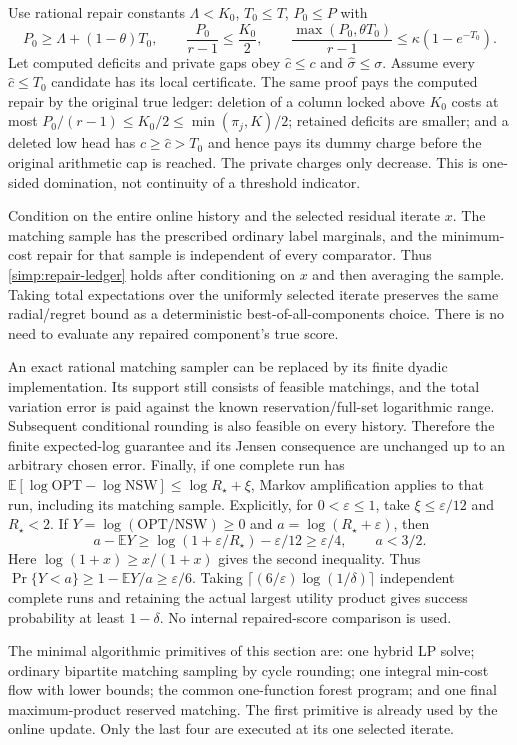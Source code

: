 Use rational repair constants $\Lambda<K_0$, $T_0\le T$, $P_0\le P$
with
\[
 P_0\ge\Lambda+(1-\theta)T_0,\qquad
 \frac{P_0}{r-1}\le\frac{K_0}{2},\qquad
 \frac{\max(P_0,\theta T_0)}{r-1}
                         \le\kappa(1-e^{-T_0}).
\]
Let computed deficits and private gaps obey $\widehat c\le c$ and
$\widehat\sigma\le\sigma$.  Assume every $\widehat c\le T_0$ candidate
has its local certificate.  The same proof pays the computed repair
by the original true ledger: deletion of a column locked above $K_0$
costs at most $P_0/(r-1)\le K_0/2\le\min(\pi_j,K)/2$;
retained deficits are smaller; and
a deleted low head has $c\ge\widehat c>T_0$ and hence pays its dummy
charge before the original arithmetic cap is reached.  The private
charges only decrease.  This is one-sided domination, not continuity
of a threshold indicator.

Condition on the entire online history and the selected residual
iterate $x$.  The matching sample has the prescribed ordinary label
marginals, and the minimum-cost repair for that sample is independent
of every comparator.  Thus \eqref{simp:repair-ledger} holds after
conditioning on $x$ and then averaging the sample.  Taking total
expectations over the uniformly selected iterate preserves the same
radial/regret bound as a deterministic best-of-all-components choice.
There is no need to evaluate any repaired component's true score.

An exact rational matching sampler can be replaced by its finite
dyadic implementation.  Its support still consists of feasible
matchings, and the total variation error is paid against the known
reservation/full-set logarithmic range.  Subsequent conditional
rounding is also feasible on every history.  Therefore the finite
expected-log guarantee and its Jensen consequence are unchanged up
to an arbitrary chosen error.  Finally, if one complete run has
$\mathbb E[\log\mathrm{OPT}-\log\mathrm{NSW}]\le\log R_\star+\xi$,
Markov amplification applies to that run, including its matching
sample.  Explicitly, for $0<\varepsilon\le1$, take
$\xi\le\varepsilon/12$ and $R_\star<2$.  If
$Y=\log(\mathrm{OPT}/\mathrm{NSW})\ge0$ and
$a=\log(R_\star+\varepsilon)$, then
\[
 a-\mathbb EY\ge
 \log(1+\varepsilon/R_\star)-\varepsilon/12
 \ge\varepsilon/4,\qquad a<3/2.
\]
Here $\log(1+x)\ge x/(1+x)$ gives the second inequality.
Thus $\Pr\{Y<a\}\ge1-\mathbb EY/a\ge\varepsilon/6$.
Taking $\lceil(6/\varepsilon)\log(1/\delta)\rceil$ independent
complete runs and retaining the actual largest utility product gives
success probability at least $1-\delta$.  No internal repaired-score
comparison is used.

The minimal algorithmic primitives of this section are: one hybrid
LP solve; ordinary bipartite matching sampling by cycle rounding;
one integral min-cost flow with lower bounds; the common one-function
forest program; and one final maximum-product reserved matching.
The first primitive is already used by the online update.  Only the
last four are executed at its one selected iterate.
